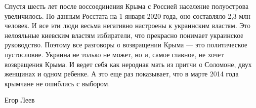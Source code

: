 Спустя шесть лет после воссоединения Крыма с Россией население полуострова
увеличилось. По данным Росстата на 1 января 2020 года, оно составляло 2,3 млн
человек. И все эти люди весьма негативно настроены к украинским властям. Это
нелояльные киевским властям избиратели, что прекрасно понимает украинское
руководство. Поэтому все разговоры о возвращении Крыма --- это политическое
пустословие. Украина не только не может, но и, самое главное, не хочет
возвращения Крыма. И ведет себя как неродная мать из притчи о Соломоне, двух
женщинах и одном ребенке. А это еще раз показывает, что в марте 2014 года
крымчане не ошиблись с выбором.

Егор Леев
  
